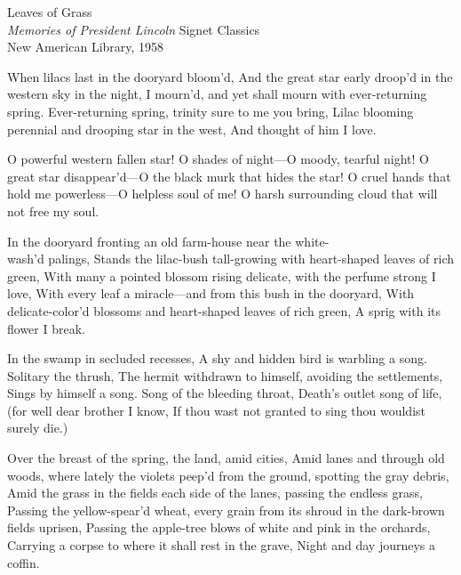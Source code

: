 \documentclass[11pt]{book}
\newenvironment {poem} [1]
 {\titulus{#1}%
  \versus
  \Nstanza{0}%
  \numerus{1}}
 {\endversus}
\begin{document}
              {Leaves of Grass\\[3ex]
              \textit{Memories of President Lincoln}}
              {Signet Classics\\[.5ex]New American Library, 1958}

\pagestyle {whitman} 
\thispagestyle {empty} 




\begin{poem}{When Lilacs Last in the Dooryard Bloom'd}


  \Modus \excessus {\justified[850]}
  \Facies \strophae {\Snumber}

\stropha %

When lilacs last in the dooryard bloom'd,
And the great star early droop'd in the western sky in the night,
I mourn'd, and yet shall mourn with ever-returning spring.
     \vacua
Ever-returning spring, trinity sure to me you bring,
Lilac blooming perennial and drooping star in the west,
And thought of him I love.

\stropha %

O powerful western fallen star!
O shades of night---O moody, tearful night!
O great star disappear'd---O the black murk that hides the star!
O cruel hands that hold me powerless---O helpless soul of me!
O harsh surrounding cloud that will not free my soul.


\stropha %

In the dooryard fronting an old farm-house near the white-\\wash'd palings,
Stands the lilac-bush tall-growing with heart-shaped leaves of rich green,
With many a pointed blossom rising delicate, with the perfume strong I love,
With every leaf a miracle---and from this bush in the dooryard,
With delicate-color'd blossoms and heart-shaped leaves of rich green,
A sprig with its flower I break.

\stropha %

In the swamp in secluded recesses,
A shy and hidden bird is warbling a song.
     \vacua
Solitary the thrush,
The hermit withdrawn to himself, avoiding the settlements,
Sings by himself a song.
     \vacua
Song of the bleeding throat,
Death's outlet song of life, (for well dear brother I know,
If thou wast not granted to sing thou wouldist surely die.)

\stropha %

Over the breast of the spring, the land, amid cities,
Amid lanes and through old woods, where lately the violets peep'd %
    from the ground, spotting the gray debris,
Amid the grass in the fields each side of the lanes, passing the %
    endless grass,
Passing the yellow-spear'd wheat, every grain from its shroud in the %
    dark-brown fields uprisen,
Passing the apple-tree blows of white and pink in the orchards,
Carrying a corpse to where it shall rest in the grave,
Night and day journeys a coffin.


\end{poem}
\end{document}

